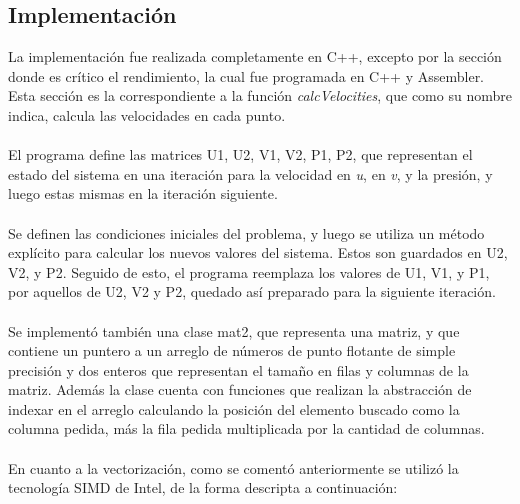 \subsection{Implementación}
La implementación fue realizada completamente en C++, excepto por la sección donde es crítico el rendimiento, la cual fue programada en C++ y Assembler. Esta sección es la correspondiente a la función \textit{calcVelocities}, que como su nombre indica, calcula las velocidades en cada punto.
~\\
~\\
El programa define las matrices U1, U2, V1, V2, P1, P2, que representan el estado del sistema en una iteración para la velocidad en \textit{u}, en \textit{v}, y la presión, y luego estas mismas en la iteración siguiente. 
~\\
~\\
Se definen las condiciones iniciales del problema, y luego se utiliza un método explícito para calcular los nuevos valores del sistema. Estos son guardados en U2, V2, y P2. Seguido de esto, el programa reemplaza los valores de U1, V1, y P1, por aquellos de U2, V2 y P2, quedado así preparado para la siguiente iteración. 
~\\
~\\
Se implementó también una clase mat2, que representa una matriz, y que contiene un puntero a un arreglo de números de punto flotante de simple precisión y dos enteros que representan el tamaño en filas y columnas de la matriz. Además la clase cuenta con funciones que realizan la abstracción de indexar en el arreglo calculando la posición del elemento buscado como la columna pedida, más la fila pedida multiplicada por la cantidad de columnas. 
~\\
~\\
En cuanto a la vectorización, como se comentó anteriormente se utilizó la tecnología SIMD de Intel, de la forma descripta a continuación:
